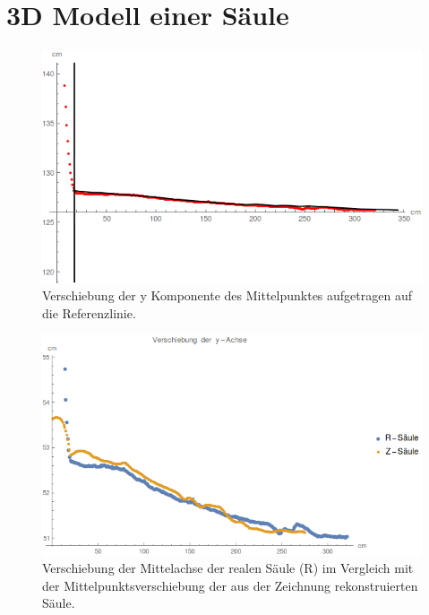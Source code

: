 \documentclass[twocolumn]{bmcart}
\begin{document}
\section{3D Modell einer Säule}

\begin{figure}[h]
\centering
\includegraphics[width=1\linewidth]{figures/FullMotion.png}
\caption{Verschiebung der y Komponente des Mittelpunktes aufgetragen auf die Referenzlinie.}
\label{fig:fullmotion}
\end{figure}

\begin{figure}[h]
\centering
\includegraphics[width=1\linewidth]{figures/CompareZR.png}
\caption{Verschiebung der Mittelachse der realen Säule (R) im Vergleich mit der Mittelpunktsverschiebung der aus der Zeichnung rekonstruierten Säule.}
\label{fig:compare}
\end{figure}
\end{document}
